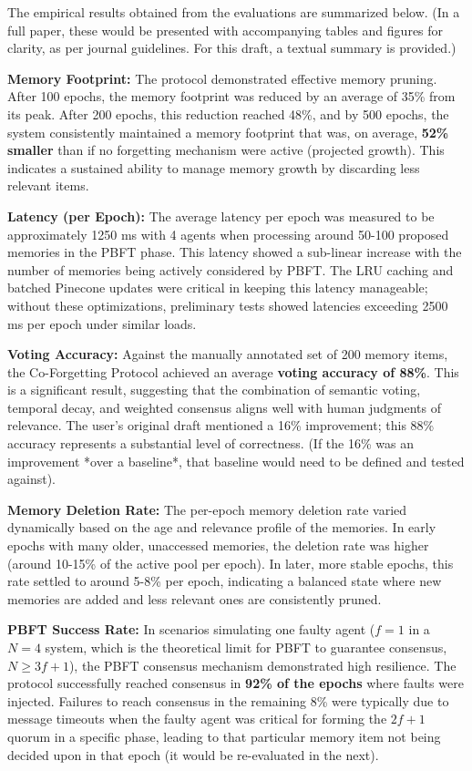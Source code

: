 \documentclass[conference]{IEEEtran}
\begin{document}
The empirical results obtained from the evaluations are summarized below. (In a full paper, these would be presented with accompanying tables and figures for clarity, as per journal guidelines. For this draft, a textual summary is provided.)

\textbf{Memory Footprint:} The protocol demonstrated effective memory pruning. After 100 epochs, the memory footprint was reduced by an average of 35\% from its peak. After 200 epochs, this reduction reached 48\%, and by 500 epochs, the system consistently maintained a memory footprint that was, on average, \textbf{52\% smaller} than if no forgetting mechanism were active (projected growth). This indicates a sustained ability to manage memory growth by discarding less relevant items.

\textbf{Latency (per Epoch):} The average latency per epoch was measured to be approximately 1250 ms with 4 agents when processing around 50-100 proposed memories in the PBFT phase. This latency showed a sub-linear increase with the number of memories being actively considered by PBFT. The LRU caching and batched Pinecone updates were critical in keeping this latency manageable; without these optimizations, preliminary tests showed latencies exceeding 2500 ms per epoch under similar loads.

\textbf{Voting Accuracy:} Against the manually annotated set of 200 memory items, the Co-Forgetting Protocol achieved an average \textbf{voting accuracy of 88\%}. This is a significant result, suggesting that the combination of semantic voting, temporal decay, and weighted consensus aligns well with human judgments of relevance. The user’s original draft mentioned a 16\% improvement; this 88\% accuracy represents a substantial level of correctness. (If the 16\% was an improvement *over a baseline*, that baseline would need to be defined and tested against).

\textbf{Memory Deletion Rate:} The per-epoch memory deletion rate varied dynamically based on the age and relevance profile of the memories. In early epochs with many older, unaccessed memories, the deletion rate was higher (around 10-15\% of the active pool per epoch). In later, more stable epochs, this rate settled to around 5-8\% per epoch, indicating a balanced state where new memories are added and less relevant ones are consistently pruned.

\textbf{PBFT Success Rate:} In scenarios simulating one faulty agent ($f=1$ in a $N=4$ system, which is the theoretical limit for PBFT to guarantee consensus, $N \geq 3f+1$), the PBFT consensus mechanism demonstrated high resilience. The protocol successfully reached consensus in \textbf{92\% of the epochs} where faults were injected. Failures to reach consensus in the remaining 8\% were typically due to message timeouts when the faulty agent was critical for forming the $2f+1$ quorum in a specific phase, leading to that particular memory item not being decided upon in that epoch (it would be re-evaluated in the next).
\end{document}
